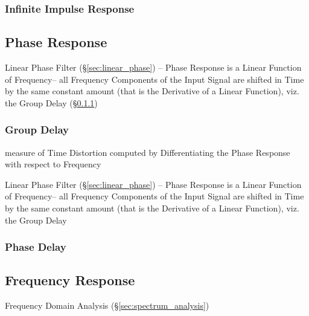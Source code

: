 \subsubsection{Infinite Impulse Response}\label{sec:iir}



\subsection{Phase Response}\label{sec:phase_response}

Linear Phase Filter (\S\ref{sec:linear_phase}) -- Phase Response is a Linear
Function of Frequency-- all Frequency Components of the Input Signal are shifted
in Time by the same constant amount (that is the Derivative of a Linear
Function), viz. the Group Delay (\S\ref{sec:group_delay})



\subsubsection{Group Delay}\label{sec:group_delay}

measure of Time Distortion computed by Differentiating the Phase Response with
respect to Frequency

Linear Phase Filter (\S\ref{sec:linear_phase}) -- Phase Response is a Linear
Function of Frequency-- all Frequency Components of the Input Signal are shifted
in Time by the same constant amount (that is the Derivative of a Linear
Function), viz. the Group Delay



\subsubsection{Phase Delay}\label{sec:phase_delay}



\subsection{Frequency Response}\label{sec:frequency_response}

\fist Frequency Domain Analysis (\S\ref{sec:spectrum_analysis})



